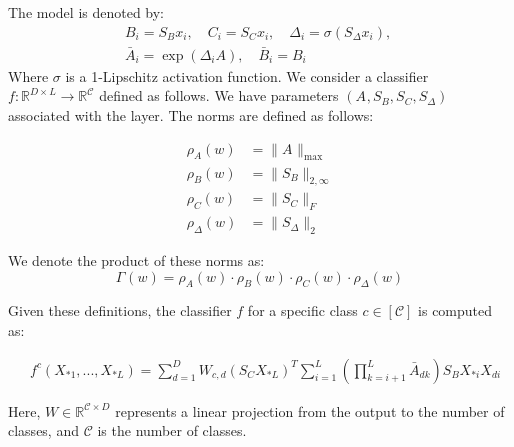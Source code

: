 The model is denoted by:
\begin{equation}\label{eq:modelAppendix}
\begin{aligned} 
      &B_i = S_B x_i, \quad C_i = S_C x_i, \quad \Delta_i = \sigma(S_{\Delta} x_i), \quad  \\&\bar{A}_i =  \exp(\Delta_i A), \quad \bar{B}_i = B_i 
\end{aligned}
\end{equation}
Where \( \sigma \) is a 1-Lipschitz activation function. 
We consider a classifier $f : \mathbb{R}^{D \times L} \rightarrow \mathbb{R}^{\mathcal{C}}$ defined as follows. We have parameters $(A^{}, S_B^{}, S_C^{}, S_{\Delta}^{})$ associated with the layer. The norms are defined as follows:

\begin{equation}
\begin{aligned} 
    \rho_A^{}(w) &= \|A^{}\|_{\max} \\
    \rho_B^{}(w) &= \|S_B^{}\|_{2,\infty} \\
    \rho_C^{}(w) &= \|S_C^{}\|_{F} \\
    \rho_{\Delta}^{}(w) &= \|S_{\Delta}^{}\|_{2}
\end{aligned}
\end{equation}

We denote the product of these norms as:
\begin{equation}
\Gamma^{}(w) = \rho_A^{}(w) \cdot \rho_B^{}(w) \cdot \rho_C^{}(w) \cdot \rho_{\Delta}^{}(w)
\end{equation}

Given these definitions, the classifier $f$ for a specific class $c \in [\mathcal{C}]$ is computed as:

\begin{small}
\begin{equation*}
\begin{aligned}
&f^c(X_{*1},...,X_{*L}) =  
\sum_{d=1}^D W_{c,d} \left(S_C^{} X^{}_{*L}\right)^T \sum_{i=1}^L \left(\prod_{k=i+1}^L \bar{A}^{}_{dk} \right) S_B^{} X^{}_{*i} X^{}_{di}
\end{aligned}
\end{equation*}
\end{small}

Here, $W \in \mathbb{R}^{\mathcal{C} \times D}$ represents a linear projection from the output to the number of classes, and $\mathcal{C}$ is the number of classes. 


